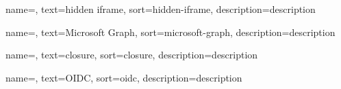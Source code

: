  {
    name=,
    text=hidden iframe,
    sort=hidden-iframe,
    description={description}
}

 {
    name=,
    text=Microsoft Graph,
    sort=microsoft-graph,
    description={description}
}

 {
    name=,
    text=closure,
    sort=closure,
    description={description}
}

 {
    name=,
    text=OIDC,
    sort=oidc,
    description={description}
}

